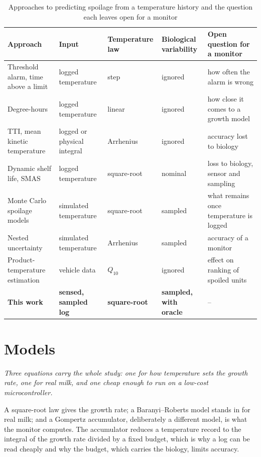 \documentclass[11pt,a4paper,twoside,openany]{book}
\newcommand{\hook}[1]{{\noindent\fontsize{14}{20}\selectfont\itshape\color{dggrey}#1\par}\vspace{14pt}}
\theoremstyle{plain}\newtheorem{proposition}{Proposition}\newtheorem{corollary}{Corollary}
\theoremstyle{definition}\newtheorem{definition}{Definition}[chapter]
\begin{document}
\begin{table}[!htbp]\centering\footnotesize
\caption{Approaches to predicting spoilage from a temperature history and the question each leaves open for a monitor}\label{tab:approaches}
\setlength{\tabcolsep}{3pt}
\begin{tabular}{@{}p{3.3cm}p{2.3cm}p{2.0cm}p{2.0cm}p{4.4cm}@{}}\toprule\rowcolor{dghead}
Approach & Input & Temperature law & Biological variability & Open question for a monitor\\\midrule
Threshold alarm, time above a limit & logged temperature & step & ignored & how often the alarm is wrong\\
Degree-hours & logged temperature & linear & ignored & how close it comes to a growth model\\
TTI, mean kinetic temperature \cite{taoukis1989,kim2020} & logged or physical integral & Arrhenius & ignored & accuracy lost to biology\\
Dynamic shelf life, SMAS \cite{koutsoumanis2001,koutsoumanis2005} & logged temperature & square-root & nominal & loss to biology, sensor and sampling\\
Monte Carlo spoilage models \cite{lau2022,buehler2018,qian2023} & simulated temperature & square-root & sampled & what remains once temperature is logged\\
Nested uncertainty \cite{giannakourou2020} & simulated temperature & Arrhenius & sampled & accuracy of a monitor\\
Product-temperature estimation \cite{zou2023} & vehicle data & $Q_{10}$ & ignored & effect on ranking of spoiled units\\
\textbf{This work} & \textbf{sensed, sampled log} & \textbf{square-root} & \textbf{sampled, with oracle} & --\\
\bottomrule\end{tabular}\end{table}

\chapter{Models}\label{ch:models}
\hook{Three equations carry the whole study: one for how temperature sets the growth rate, one for real milk, and one cheap enough to run on a low-cost microcontroller.}
\begin{summary}
A square-root law gives the growth rate; a Baranyi--Roberts model stands in for real milk; and a Gompertz accumulator, deliberately a different model, is what the monitor computes. The accumulator reduces a temperature record to the integral of the growth rate divided by a fixed budget, which is why a log can be read cheaply and why the budget, which carries the biology, limits accuracy.
\end{summary}
\end{document}
